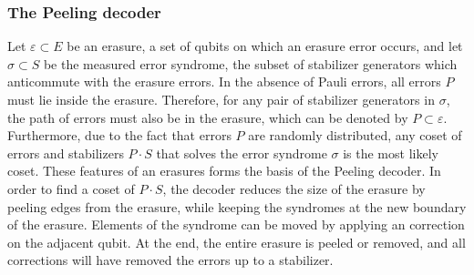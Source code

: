 \subsubsection{The Peeling decoder}
Let $\varepsilon \subset E$ be an erasure, a set of qubits on which an erasure error occurs, and let $\sigma \subset S$ be the measured error syndrome, the subset of stabilizer generators which anticommute with the erasure errors. In the absence of Pauli errors, all errors $P$ must lie inside the erasure. Therefore, for any pair of stabilizer generators in $\sigma$, the path of errors must also be in the erasure, which can be denoted by $P\subset \varepsilon$. Furthermore, due to the fact that errors $P$ are randomly distributed, any coset of errors and stabilizers $P\cdot S$ that solves the error syndrome $\sigma$ is the most likely coset. These features of an erasures forms the basis of the Peeling decoder. In order to find a coset of $P \cdot S$, the decoder reduces the size of the erasure by peeling edges from the erasure, while keeping the syndromes at the new boundary of the erasure. Elements of the syndrome can be moved by applying an correction on the adjacent qubit. At the end, the entire erasure is peeled or removed, and all corrections will have removed the errors up to a stabilizer.


